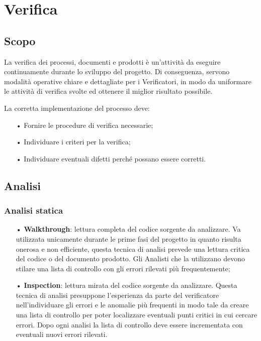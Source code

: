 





\section{Verifica}

\subsection{Scopo}

La verifica dei processi, documenti e prodotti è un’attività da eseguire continuamente durante lo sviluppo del progetto. Di conseguenza, servono modalità operative chiare e dettagliate per i Verificatori, in modo da uniformare le attività di verifica svolte ed ottenere il miglior risultato possibile. 

La corretta implementazione del processo deve:
\begin{itemize}
\item[•] Fornire le procedure di verifica necessarie; 
\item[•] Individuare i criteri per la verifica; 
\item[•] Individuare eventuali difetti perché possano essere corretti.
\end{itemize}

\subsection{Analisi}

\subsubsection{Analisi statica}
\begin{itemize}
\item[•] \textbf{Walkthrough}: lettura completa del codice sorgente da analizzare. Va utilizzata unicamente durante le prime fasi del progetto in quanto risulta onerosa e non efficiente, questa tecnica di analisi prevede una lettura critica del codice o del documento prodotto. Gli Analisti che la utilizzano devono stilare una lista di controllo con gli errori rilevati più frequentemente;
\item[•] \textbf{Inspection}: lettura mirata del codice sorgente da analizzare. Questa tecnica di analisi presuppone l’esperienza da parte del verificatore nell’individuare gli errori e le anomalie più frequenti in modo tale da creare una lista di controllo per poter localizzare eventuali punti critici in cui cercare errori. Dopo ogni analisi la lista di controllo deve essere incrementata con eventuali nuovi errori rilevati.
\end{itemize}

